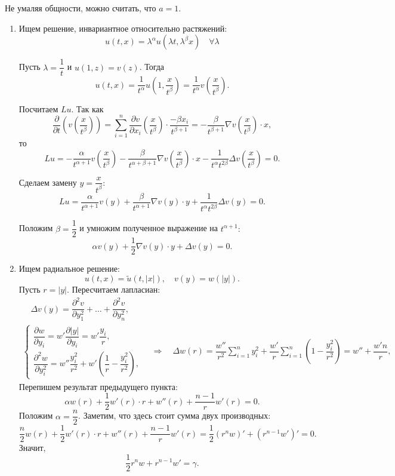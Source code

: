 Не умаляя общности, можно считать, что $a = 1$.

\begin{enumerate}
\item Ищем решение, инвариантное относительно растяжений:
$$u(t,x) = \lambda^\alpha u(\lambda t, \lambda^\beta x) \quad \forall \lambda$$

Пусть $\lambda = \dfrac{1} {t}$ и $u(1, z) = v(z)$. Тогда
$$u(t,x) = \frac{1}{t^\alpha} u \left( 1, \frac{x}{t^\beta} \right) = \frac {1} {t^\alpha} v \left( \frac{x}{t^\beta} \right).$$

Посчитаем $Lu$. Так как
$$\frac{\partial}{\partial t} \left(v\left( \frac{x}{t^\beta}\right)\right) = \sum \limits_{i=1}^n \frac{ \partial v}{\partial x_i}\left(\frac{x}{t^\beta}\right) \cdot \frac{-\beta x_i}{t^{\beta + 1}} = -\frac{\beta}{t^{\beta + 1}}\nabla v\left( \frac{x}{t^\beta}\right) \cdot x,$$
то
$$Lu = -\frac{\alpha}{t^{\alpha + 1}} v\left( \dfrac{x}{t^\beta}\right) - \dfrac{\beta}{t^{\alpha + \beta + 1}}\nabla v\left( \dfrac{x}{t^\beta}\right)\cdot x - \dfrac{1}{t^\alpha t^{2\beta}}\Delta v\left( \dfrac{x}{t^\beta}\right) = 0.$$

Сделаем замену $ y = \dfrac{x} {t^\beta}$:
$$Lu =  \dfrac{\alpha}{t^{\alpha + 1}} v(y) + \dfrac{\beta}{t^{\alpha + 1}} \nabla v(y) \cdot y + \dfrac{1}{t^\alpha  t^{2\beta}}\Delta v(y)=0.$$

Положим $\beta = \dfrac{1}{2}$ и умножим полученное выражение на $t^{\alpha + 1}:$
$$\alpha v(y) + \dfrac{1}{2} \nabla v(y) \cdot y + \Delta v(y) = 0.$$

\item Ищем радиальное решение:
$$u(t,x) = \tilde{u}(t,|x|), \quad v(y) = w(|y|).$$
Пусть $r = |y|$. Пересчитаем лапласиан:
\begin{gather*}
	\quad \Delta v(y) = \dfrac{\partial^2v}{\partial y_1^2} + \dots + \dfrac{\partial^2v}{\partial y_n^2}, \\
	\begin{cases*}
		\dfrac{\partial w}{\partial y_i} = w' \dfrac{\partial |y|}{\partial y_i} = w' \dfrac{y_i}{r}, \\
		\dfrac{\partial^2 w}{\partial y_i^2} = w''\dfrac{y_i^2}{r^2} + w'\left(\dfrac{1}{r} - \dfrac{y_i^2}{r^2}\right),
	\end{cases*}
	\quad \Rightarrow \quad
	\Delta w(r) = \dfrac{w''}{r^2}\sum \limits_{i=1}^n y_i^2 + \dfrac{w'}{r}\sum \limits_{i=1}^n (1 - \dfrac{y_i^2}{r^2}) = w'' + \dfrac{w'n}{r},
\end{gather*}
Перепишем результат предыдущего пункта:
$$ \alpha w(r) + \dfrac{1}{2} w'(r) \cdot r + w''(r) + \dfrac{n-1}{r}w'(r) = 0.$$
Положим $\alpha = \dfrac{n}{2}$. Заметим, что здесь стоит сумма двух производных:
$$ \dfrac{n}{2}w(r) + \dfrac{1}{2}w'(r) \cdot r + w''(r) + \dfrac{n-1}{r}w'(r) = \dfrac{1}{2}\left(r^nw\right)' + \left(r^{n-1}w'\right)' = 0.$$
Значит,
$$ \dfrac{1}{2} r^n w+ r^{n-1} w' = \gamma. $$


\end{enumerate}
